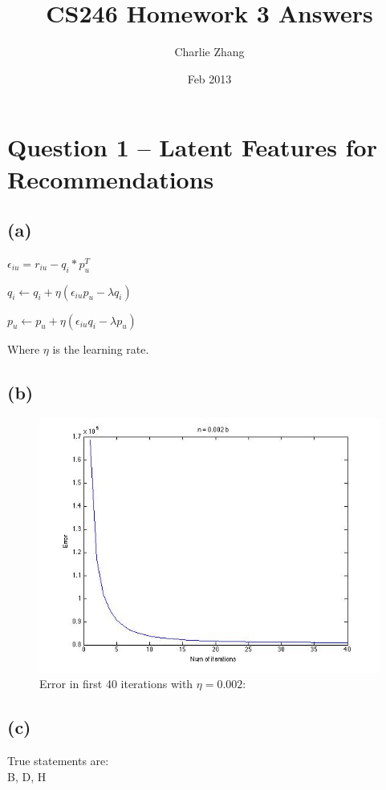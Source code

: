 \documentclass{article}
\title{CS246 Homework 3 Answers}
\author{Charlie Zhang}
\date{Feb 2013}
\begin{document}
\maketitle
\section{Question 1 -- Latent Features for Recommendations}


\subsection{(a)}
$\epsilon_{iu} = r_{iu} - q_i * p_u^T$

$q_i \leftarrow q_i + \eta(\epsilon_{iu}p_u - \lambda q_i)$

$p_u \leftarrow p_u + \eta(\epsilon_{iu}q_i - \lambda p_u)$

Where $\eta$ is the learning rate.

\subsection{(b)}
\begin{figure}[H]
\centering
\includegraphics[scale=0.5]{EAsOfIterationEta0002.jpg}
\caption{ Error in first 40 iterations with $\eta=0.002$: }
\label{}
\end{figure}


\subsection{(c)}
True statements are: \\
B, D, H
\end{document}
